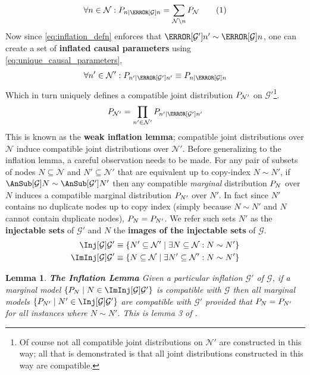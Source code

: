 \documentclass[aps, 10pt, english, twoside, pra, nofootinbib, longbibliography]{revtex4-1}
\theoremstyle{plain}
\newtheorem{lemma}[theorem]{Lemma}
\theoremstyle{definition}
\theoremstyle{remark}
\newcommand{\graph}{\mathcal{G}}
\newcommand{\nodes}{\mathcal{N}}
\newcommand{\term}[1]{\textcolor{Mahogany}{\textbf{#1}}}
\begin{document}
    \[ \forall n \in \nodes : \prob[n\mid \Pa[\graph]{n}] = \sum_{\nodes \setminus n} \prob[\nodes] \eq \label{eq:unique_causal_parameters}\]
    Now since \cref{eq:inflation_defn} enforces that $\Pa[\graph']{n'} \sim \Pa[\graph]{n}$, one can create a set of \term{inflated causal parameters} using \cref{eq:unique_causal_parameters},
    \[ \forall n' \in \nodes' : \prob[n'\mid \Pa[\graph']{n'}] \defined \prob[n\mid \Pa[\graph]{n}] \]
    Which in turn uniquely defines a compatible joint distribution $\prob[\nodes']$ on $\graph'$\footnote{Of course not all compatible joint distributions on $\nodes'$ are constructed in this way; all that is demonstrated is that all joint distributions constructed in this way are compatible.}.
    \[ \prob[\nodes'] = \prod_{n' \in \nodes'} \prob[n'\mid \Pa[\graph']{n'}] \]
    This is known as the \term{weak inflation lemma}; compatible joint distributions over $\nodes$ induce compatible joint distributions over $\nodes'$. Before generalizing to the inflation lemma, a careful observation needs to be made. For any pair of subsets of nodes $N \subseteq \nodes$ and $N' \subseteq \nodes'$ that are equivalent up to copy-index $N \sim N'$, if $\AnSub[\graph]{N} \sim \AnSub[\graph']{N'}$ then any compatible \textit{marginal} distribution $\prob[N]$ over $N$ induces a compatible marginal distribution $\prob[N']$ over $N'$. In fact since $N'$ contains no duplicate nodes up to copy index (simply because $N \sim N'$ and $N$ cannot contain duplicate nodes), $\prob[N] = \prob[N']$. We refer such sets $N'$ as the \term{injectable sets} of $\graph'$ and $N$ the \term{images of the injectable sets} of $\graph$.
    \begin{align*}
        \Inj[\graph]{\graph'} &\defined \bc{N' \subseteq \nodes' \mid \exists N \subseteq \nodes : N \sim N'} \\
        \ImInj[\graph]{\graph'} &\defined \bc{N \subseteq \nodes \mid \exists N' \subseteq \nodes' : N \sim N'}
    \end{align*}

    \begin{lemma}
        \label{lem:inflation}
        \term{The Inflation Lemma} Given a particular inflation $\graph'$ of $\graph$, if a marginal model $\bc{\prob[N] \mid N \in \ImInj[\graph]{\graph'}}$ is compatible with $\graph$ then all marginal models $\bc{\prob[N'] \mid N' \in \Inj[\graph]{\graph'}}$ are compatible with $\graph'$ provided that $\prob[N] = \prob[N']$ for all instances where $N \sim N'$.
        This is lemma 3 of \cite{Inflation}.
    \end{lemma}
\end{document}
